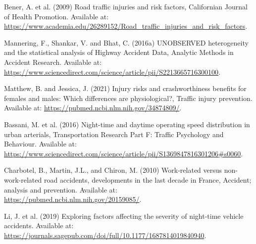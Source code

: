 \documentclass[12]{report}
\begin{document}
\begin{thebibliography}{9}
Bener, A. et al. (2009) Road traffic injuries and risk factors, Californian Journal of Health Promotion. Available at: \url{https://www.academia.edu/26289152/Road_traffic_injuries_and_risk_factors}.


Mannering, F., Shankar, V. and Bhat, C. (2016a) UNOBSERVED heterogeneity and the statistical analysis of Highway Accident Data, Analytic Methods in Accident Research. Available at: \url{https://www.sciencedirect.com/science/article/pii/S2213665716300100}.

Matthew, B. and Jessica, J. (2021) Injury risks and crashworthiness benefits for females and males: Which differences are physiological?, Traffic injury prevention. Available at: \url{https://pubmed.ncbi.nlm.nih.gov/34874809/}.

Bassani, M. et al. (2016) Night-time and daytime operating speed distribution in urban arterials, Transportation Research Part F: Traffic Psychology and Behaviour. Available at: \url{https://www.sciencedirect.com/science/article/pii/S1369847816301206#s0060}.

Charbotel, B., Martin, J.L., and Chiron, M. (2010) Work-related versus non-work-related road accidents, developments in the last decade in France, Accident; analysis and prevention. Available at: \url{https://pubmed.ncbi.nlm.nih.gov/20159085/}.

Li, J. et al. (2019) Exploring factors affecting the severity of night-time vehicle accidents. Available at: \url{https://journals.sagepub.com/doi/full/10.1177/1687814019840940}.



\end{thebibliography}
\end{document}
